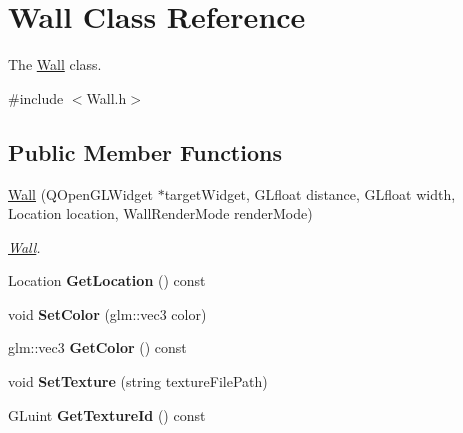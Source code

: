 \hypertarget{class_wall}{}\section{Wall Class Reference}
\label{class_wall}


The \hyperlink{class_wall}{Wall} class.  




{\ttfamily \#include $<$Wall.\+h$>$}

\subsection*{Public Member Functions}
\begin{DoxyCompactItemize}
\item 
\hyperlink{class_wall_a63c0ce873bd396cd64328bc789d9b52d}{Wall} (Q\+Open\+G\+L\+Widget $\ast$target\+Widget, G\+Lfloat distance, G\+Lfloat width, Location location, Wall\+Render\+Mode render\+Mode)
\begin{DoxyCompactList}\small\item\em \hyperlink{class_wall}{Wall}. \end{DoxyCompactList}\item 
\hypertarget{class_wall_a69e3d769d03cc7710cff5ec12016d041}{}Location {\bfseries Get\+Location} () const \label{class_wall_a69e3d769d03cc7710cff5ec12016d041}

\item 
\hypertarget{class_wall_a25a9a26b711c82e87b4c62c0f0e310a4}{}void {\bfseries Set\+Color} (glm\+::vec3 color)\label{class_wall_a25a9a26b711c82e87b4c62c0f0e310a4}

\item 
\hypertarget{class_wall_a702eceba533217b2c8fe32e35bdc1a55}{}glm\+::vec3 {\bfseries Get\+Color} () const \label{class_wall_a702eceba533217b2c8fe32e35bdc1a55}

\item 
\hypertarget{class_wall_a6fc29461ede774d8d87019b7f002d15a}{}void {\bfseries Set\+Texture} (string texture\+File\+Path)\label{class_wall_a6fc29461ede774d8d87019b7f002d15a}

\item 
\hypertarget{class_wall_a37e7497af0a99b1093dd54dfd6bd90cf}{}G\+Luint {\bfseries Get\+Texture\+Id} () const \label{class_wall_a37e7497af0a99b1093dd54dfd6bd90cf}


\end{DoxyCompactItemize}
